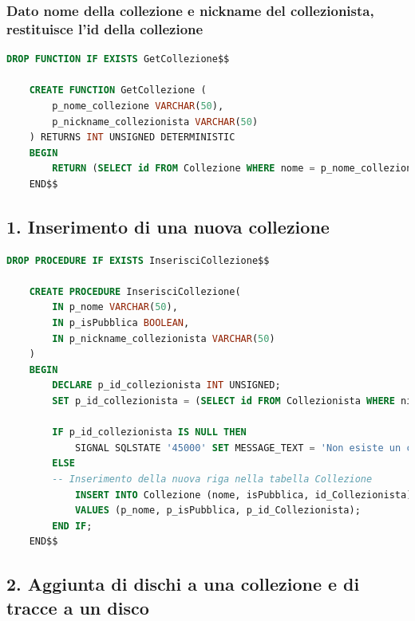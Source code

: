 \documentclass{article}
\begin{document}
\subsubsection{Dato nome della collezione e nickname del collezionista, restituisce l'id della collezione}
\begin{lstlisting}[language=SQL]
    DROP FUNCTION IF EXISTS GetCollezione$$

    CREATE FUNCTION GetCollezione (
        p_nome_collezione VARCHAR(50),
        p_nickname_collezionista VARCHAR(50)
    ) RETURNS INT UNSIGNED DETERMINISTIC
    BEGIN
        RETURN (SELECT id FROM Collezione WHERE nome = p_nome_collezione AND id_collezionista = (SELECT id FROM Collezionista WHERE nickname = p_nickname_collezionista));
    END$$
    \end{lstlisting}

\subsection*{1. Inserimento di una nuova collezione}
\begin{lstlisting}[language=SQL]
    DROP PROCEDURE IF EXISTS InserisciCollezione$$

    CREATE PROCEDURE InserisciCollezione(
        IN p_nome VARCHAR(50),
        IN p_isPubblica BOOLEAN,
        IN p_nickname_collezionista VARCHAR(50)
    )
    BEGIN
        DECLARE p_id_collezionista INT UNSIGNED;
        SET p_id_collezionista = (SELECT id FROM Collezionista WHERE nickname = p_nickname_collezionista);
        
        IF p_id_collezionista IS NULL THEN
            SIGNAL SQLSTATE '45000' SET MESSAGE_TEXT = 'Non esiste un collezionista con questo nickname';
        ELSE
        -- Inserimento della nuova riga nella tabella Collezione
            INSERT INTO Collezione (nome, isPubblica, id_Collezionista)
            VALUES (p_nome, p_isPubblica, p_id_Collezionista);
        END IF;
    END$$
    \end{lstlisting}

\subsection*{2. Aggiunta di dischi a una collezione e di tracce a un disco}
\end{document}
